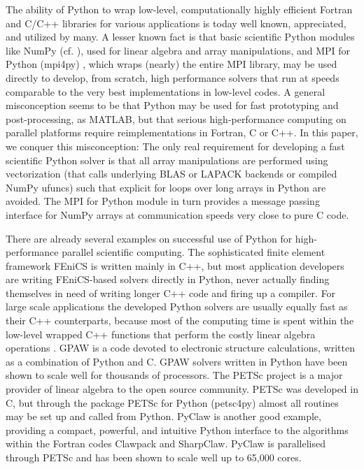 \documentclass[final,3p,times,twocolumn]{elsarticle}
\begin{document}
The ability of Python to wrap low-level, computationally highly efficient 
Fortran and C/C++ libraries for various applications is today well known, 
appreciated, and utilized by many. A lesser known fact is that basic scientific 
Python modules like NumPy (cf. \cite{numpy, van2011numpy}), used for linear 
algebra and array manipulations, and MPI for Python (mpi4py) \cite{mpi4py}, 
which wraps (nearly) the entire MPI library, may be used directly to develop, 
from scratch, 
high performance solvers that run at speeds comparable to the very best 
implementations in low-level codes. A general misconception seems to be that 
Python may be used for fast prototyping and post-processing, as MATLAB, but 
that serious high-performance computing on parallel platforms require 
reimplementations in Fortran, C or C++. In this paper, we conquer this 
misconception: The only real requirement for developing a fast scientific 
Python solver is that all array manipulations are 
performed using vectorization (that calls underlying BLAS or LAPACK backends or 
compiled NumPy ufuncs) such that explicit for loops over long arrays in Python 
are avoided. The MPI for Python module in turn provides a message passing 
interface for NumPy arrays at communication speeds very close to pure 
C code.

There are already several examples on successful use of Python for
high-performance parallel scientific computing. The sophisticated
finite element framework FEniCS \cite{fenics} is written mainly in
C++, but most application developers are writing FEniCS-based solvers
directly in Python, never actually finding themselves in need of
writing longer C++ code and firing up a compiler. For large scale
applications the developed Python solvers are usually equally fast as
their C++ counterparts, because most of the computing time is
spent within the low-level wrapped C++ functions that perform the
costly linear algebra operations \cite{Mortensen2015}.
GPAW \cite{gpaw05} is a code devoted
to electronic structure calculations, written as a combination of
Python and C. GPAW solvers written in Python have been shown to scale
well for thousands of processors.  The PETSc project \cite{petsc-web-page} is a 
major provider of linear algebra to the open source community. PETSc was
developed in C, but through the package PETSc for Python (petsc4py) almost all
routines may be set up and called from Python. PyClaw \cite{ketcheson2012}
is another good example, providing a compact, powerful, and intuitive
Python interface to the algorithms within the Fortran codes Clawpack
and SharpClaw. PyClaw is parallelised through PETSc and has been shown
to scale well up to 65,000 cores.
\end{document}
